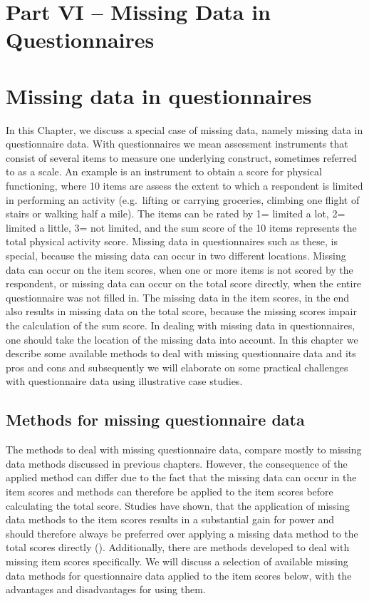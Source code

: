 \documentclass[]{book}
\begin{document}
\chapter*{Part VI -- Missing Data in
Questionnaires}\label{part-vi-missing-data-in-questionnaires}

\chapter{Missing data in
questionnaires}\label{missing-data-in-questionnaires}

In this Chapter, we discuss a special case of missing data, namely
missing data in questionnaire data. With questionnaires we mean
assessment instruments that consist of several items to measure one
underlying construct, sometimes referred to as a scale. An example is an
instrument to obtain a score for physical functioning, where 10 items
are assess the extent to which a respondent is limited in performing an
activity (e.g.~lifting or carrying groceries, climbing one flight of
stairs or walking half a mile). The items can be rated by 1= limited a
lot, 2= limited a little, 3= not limited, and the sum score of the 10
items represents the total physical activity score. Missing data in
questionnaires such as these, is special, because the missing data can
occur in two different locations. Missing data can occur on the item
scores, when one or more items is not scored by the respondent, or
missing data can occur on the total score directly, when the entire
questionnaire was not filled in. The missing data in the item scores, in
the end also results in missing data on the total score, because the
missing scores impair the calculation of the sum score. In dealing with
missing data in questionnaires, one should take the location of the
missing data into account. In this chapter we describe some available
methods to deal with missing questionnaire data and its pros and cons
and subsequently we will elaborate on some practical challenges with
questionnaire data using illustrative case studies.

\section{Methods for missing questionnaire
data}\label{methods-for-missing-questionnaire-data}

The methods to deal with missing questionnaire data, compare mostly to
missing data methods discussed in previous chapters. However, the
consequence of the applied method can differ due to the fact that the
missing data can occur in the item scores and methods can therefore be
applied to the item scores before calculating the total score. Studies
have shown, that the application of missing data methods to the item
scores results in a substantial gain for power and should therefore
always be preferred over applying a missing data method to the total
scores directly (\citet{Eekhout2014}). Additionally, there are methods
developed to deal with missing item scores specifically. We will discuss
a selection of available missing data methods for questionnaire data
applied to the item scores below, with the advantages and disadvantages
for using them.
\end{document}
